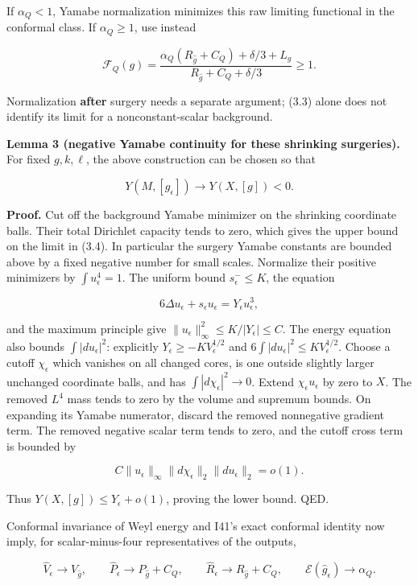 \documentclass[
  10pt,
]{article}
\begin{document}
If \(\alpha_Q<1\), Yamabe normalization minimizes this raw limiting
functional in the conformal class. If \(\alpha_Q\ge1\), use instead

\[
 \mathcal F_Q(g)=
 \frac{\alpha_Q(R_{\widehat g}+C_Q)+\delta/3+L_g}
      {R_{\widehat g}+C_Q+\delta/3}\ge1.
\]

Normalization \textbf{after} surgery needs a separate argument; (3.3)
alone does not identify its limit for a nonconstant-scalar background.

\textbf{Lemma 3 (negative Yamabe continuity for these shrinking
surgeries).} For fixed \(g,k,\ell\), the above construction can be
chosen so that

\[
 Y(M,[g_\epsilon])\longrightarrow Y(X,[g])<0.
 \tag{3.4}
\]

\textbf{Proof.} Cut off the background Yamabe minimizer on the shrinking
coordinate balls. Their total Dirichlet capacity tends to zero, which
gives the upper bound on the limit in (3.4). In particular the surgery
Yamabe constants are bounded above by a fixed negative number for small
scales. Normalize their positive minimizers by \(\int u_\epsilon^4=1\).
The uniform bound \(s_\epsilon^-\le K\), the equation

\[
 6\Delta u_\epsilon+s_\epsilon u_\epsilon
                      =Y_\epsilon u_\epsilon^3,
\]

and the maximum principle give
\(\|u_\epsilon\|_\infty^2 \le K/|Y_\epsilon|\le C\). The energy equation
also bounds \(\int|du_\epsilon|^2\): explicitly
\(Y_\epsilon\ge-KV_\epsilon^{1/2}\) and
\(6\int|du_\epsilon|^2\le KV_\epsilon^{1/2}\). Choose a cutoff
\(\chi_\epsilon\) which vanishes on all changed cores, is one outside
slightly larger unchanged coordinate balls, and has
\(\int|d\chi_\epsilon|^2\to0\). Extend \(\chi_\epsilon u_\epsilon\) by
zero to \(X\). The removed \(L^4\) mass tends to zero by the volume and
supremum bounds. On expanding its Yamabe numerator, discard the removed
nonnegative gradient term. The removed negative scalar term tends to
zero, and the cutoff cross term is bounded by

\[
 C\|u_\epsilon\|_\infty
       \|d\chi_\epsilon\|_2\|du_\epsilon\|_2=o(1).
\]

Thus \(Y(X,[g])\le Y_\epsilon+o(1)\), proving the lower bound. QED.

Conformal invariance of Weyl energy and I41's exact conformal identity
now imply, for scalar-minus-four representatives of the outputs,

\[
 \widehat V_\epsilon\to V_{\widehat g},\qquad
 \widehat P_\epsilon\to P_{\widehat g}+C_Q,\qquad
 \widehat R_\epsilon\to R_{\widehat g}+C_Q,
 \qquad \mathcal E(\widehat g_\epsilon)\to\alpha_Q.
 \tag{3.5}
\]
\end{document}
